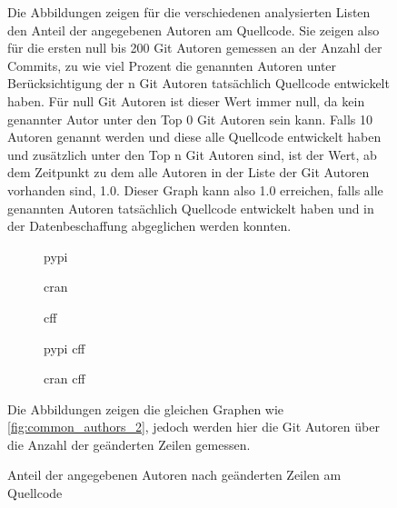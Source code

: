 \begin{figure}
    Die Abbildungen zeigen für die verschiedenen analysierten Listen den Anteil der angegebenen Autoren am Quellcode. Sie zeigen also für die ersten null bis 200 Git Autoren gemessen an der Anzahl der Commits, zu wie viel Prozent die genannten Autoren unter Berücksichtigung der n Git Autoren tatsächlich Quellcode entwickelt haben. Für null Git Autoren ist dieser Wert immer null, da kein genannter Autor unter den Top 0 Git Autoren sein kann. Falls 10 Autoren genannt werden und diese alle Quellcode entwickelt haben und zusätzlich unter den Top n Git Autoren sind, ist der Wert, ab dem Zeitpunkt zu dem alle Autoren in der Liste der Git Autoren vorhanden sind, 1.0. Dieser Graph kann also 1.0 erreichen, falls alle genannten Autoren tatsächlich Quellcode entwickelt haben und in der Datenbeschaffung abgeglichen werden konnten.
\end{figure}

\begin{figure}
    \begin{subfigure}{.5\textwidth}
        \centering
        
        \caption{\gls{pypi}}
        \label{fig:common_authors_2_by_files_pypi}
    \end{subfigure}%
    \begin{subfigure}{.5\textwidth}
        \centering
        
        \caption{\gls{cran}}
        \label{fig:common_authors_2_by_files_cran}
    \end{subfigure}
    \begin{subfigure}{.5\textwidth}
        \centering
        
        \caption{\gls{cff}}
        \label{fig:common_authors_2_by_files_cff}
    \end{subfigure}%
    \begin{subfigure}{.5\textwidth}
        \centering
        
        \caption{\gls{pypi} \gls{cff}}
        \label{fig:common_authors_2_by_files_pypi_cff}
    \end{subfigure}
    \centering
    \begin{subfigure}{.5\textwidth}
        \centering
        
        \caption{\gls{cran} \gls{cff}}
        \label{fig:common_authors_2_by_files_cran_cff}
    \end{subfigure}
    \caption{Anteil der angegebenen Autoren nach geänderten Zeilen am Quellcode}
    \label{fig:common_authors_2_by_files}
    \small
    \raggedright
    Die Abbildungen zeigen die gleichen Graphen wie \autoref{fig:common_authors_2}, jedoch werden hier die Git Autoren über die Anzahl der geänderten Zeilen gemessen.
\end{figure}

